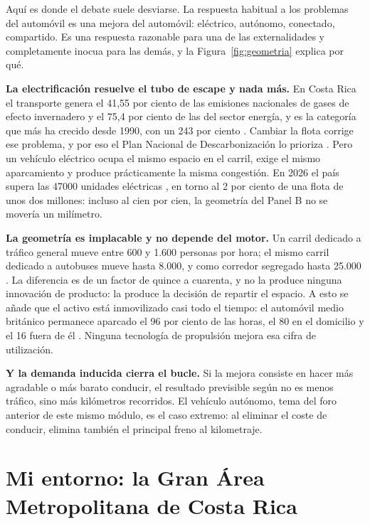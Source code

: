 \documentclass[11pt,letterpaper]{article}
\begin{document}
Aquí es donde el debate suele desviarse. La respuesta habitual a los problemas
del automóvil es una mejora del automóvil: eléctrico, autónomo, conectado,
compartido. Es una respuesta razonable para una de las externalidades y
completamente inocua para las demás, y la Figura~\ref{fig:geometria} explica
por qué.

\textbf{La electrificación resuelve el tubo de escape y nada más.} En Costa
Rica el transporte genera el 41,55 por ciento de las emisiones nacionales de
gases de efecto invernadero y el 75,4 por ciento de las del sector energía, y
es la categoría que más ha crecido desde 1990, con un 243 por ciento
\parencite{dcc2021,pnud2022}. Cambiar la flota corrige ese problema, y por eso
el Plan Nacional de Descarbonización lo prioriza \parencite{descarbonizacion2019}.
Pero un vehículo eléctrico ocupa el mismo espacio en el carril, exige el mismo
aparcamiento y produce prácticamente la misma congestión. En 2026 el país
supera las \num{47000} unidades eléctricas \parencite{infobae2026}, en torno al
2 por ciento de una flota de unos dos millones: incluso al cien por cien, la
geometría del Panel B no se movería un milímetro.

\textbf{La geometría es implacable y no depende del motor.} Un carril dedicado
a tráfico general mueve entre 600 y 1.600 personas por hora; el mismo carril
dedicado a autobuses mueve hasta 8.000, y como corredor segregado hasta 25.000
\parencite{nacto2016}. La diferencia es de un factor de quince a cuarenta, y no
la produce ninguna innovación de producto: la produce la decisión de repartir
el espacio. A esto se añade que el activo está inmovilizado casi todo el
tiempo: el automóvil medio británico permanece aparcado el 96 por ciento de
las horas, el 80 en el domicilio y el 16 fuera de él \parencite{bates2012}.
Ninguna tecnología de propulsión mejora esa cifra de utilización.

\textbf{Y la demanda inducida cierra el bucle.} Si la mejora consiste en hacer
más agradable o más barato conducir, el resultado previsible según
\textcite{duranton2011} no es menos tráfico, sino más kilómetros recorridos.
El vehículo autónomo, tema del foro anterior de este mismo módulo, es el caso
extremo: al eliminar el coste de conducir, elimina también el principal freno
al kilometraje.

\section{Mi entorno: la Gran Área Metropolitana de Costa Rica}
\end{document}
